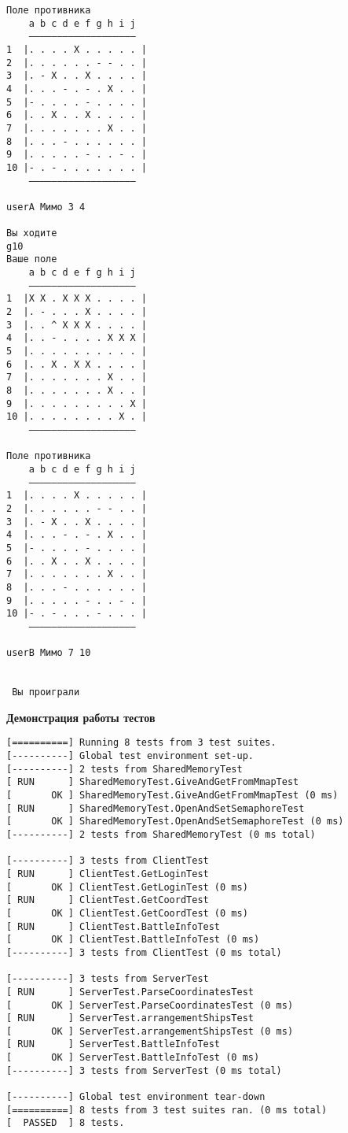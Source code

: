 \documentclass[a4paper, 14pt]{article}
\begin{document}
\begin{verbatim}
Поле противника
    a b c d e f g h i j
    ———————————————————
1  |. . . . X . . . . . |
2  |. . . . . . - - . . |
3  |. - X . . X . . . . |
4  |. . . - . - . X . . |
5  |- . . . . - . . . . |
6  |. . X . . X . . . . |
7  |. . . . . . . X . . |
8  |. . . - . . . . . . |
9  |. . . . . - . . - . |
10 |- . - . . . . . . . |
    ———————————————————

userA Мимо 3 4

Вы ходите
g10
Ваше поле
    a b c d e f g h i j
    ———————————————————
1  |X X . X X X . . . . |
2  |. - . . . X . . . . |
3  |. . ^ X X X . . . . |
4  |. . - . . . . X X X |
5  |. . . . . . . . . . |
6  |. . X . X X . . . . |
7  |. . . . . . . X . . |
8  |. . . . . . . X . . |
9  |. . . . . . . . . X |
10 |. . . . . . . . X . |
    ———————————————————

Поле противника
    a b c d e f g h i j
    ———————————————————
1  |. . . . X . . . . . |
2  |. . . . . . - - . . |
3  |. - X . . X . . . . |
4  |. . . - . - . X . . |
5  |- . . . . - . . . . |
6  |. . X . . X . . . . |
7  |. . . . . . . X . . |
8  |. . . - . . . . . . |
9  |. . . . . - . . - . |
10 |- . - . . . - . . . |
    ———————————————————

userB Мимо 7 10


 Вы проиграли
\end{verbatim}

\textbf{Демонстрация работы тестов}
\begin{verbatim}
[==========] Running 8 tests from 3 test suites.
[----------] Global test environment set-up.
[----------] 2 tests from SharedMemoryTest
[ RUN      ] SharedMemoryTest.GiveAndGetFromMmapTest
[       OK ] SharedMemoryTest.GiveAndGetFromMmapTest (0 ms)
[ RUN      ] SharedMemoryTest.OpenAndSetSemaphoreTest
[       OK ] SharedMemoryTest.OpenAndSetSemaphoreTest (0 ms)
[----------] 2 tests from SharedMemoryTest (0 ms total)

[----------] 3 tests from ClientTest
[ RUN      ] ClientTest.GetLoginTest
[       OK ] ClientTest.GetLoginTest (0 ms)
[ RUN      ] ClientTest.GetCoordTest
[       OK ] ClientTest.GetCoordTest (0 ms)
[ RUN      ] ClientTest.BattleInfoTest
[       OK ] ClientTest.BattleInfoTest (0 ms)
[----------] 3 tests from ClientTest (0 ms total)

[----------] 3 tests from ServerTest
[ RUN      ] ServerTest.ParseCoordinatesTest
[       OK ] ServerTest.ParseCoordinatesTest (0 ms)
[ RUN      ] ServerTest.arrangementShipsTest
[       OK ] ServerTest.arrangementShipsTest (0 ms)
[ RUN      ] ServerTest.BattleInfoTest
[       OK ] ServerTest.BattleInfoTest (0 ms)
[----------] 3 tests from ServerTest (0 ms total)

[----------] Global test environment tear-down
[==========] 8 tests from 3 test suites ran. (0 ms total)
[  PASSED  ] 8 tests.
\end{verbatim}
\end{document}
